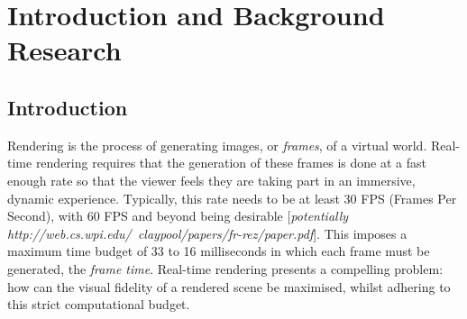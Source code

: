 \chapter{Introduction and Background Research}

\label{chapter1}

\section{Introduction}

Rendering is the process of generating images, or \textit{frames}, of a virtual world. Real-time rendering requires that the generation of these frames is done at a fast enough rate so that the viewer feels they are taking part in an immersive, dynamic experience. Typically, this rate needs to be at least 30 FPS (Frames Per Second), with 60 FPS and beyond being desirable [\textit{potentially http://web.cs.wpi.edu/~claypool/papers/fr-rez/paper.pdf}]. This imposes a maximum time budget of 33 to 16 milliseconds in which each frame must be generated, the \textit{frame time}. Real-time rendering presents a compelling problem: how can the visual fidelity of a rendered scene be maximised, whilst adhering to this strict computational budget.

